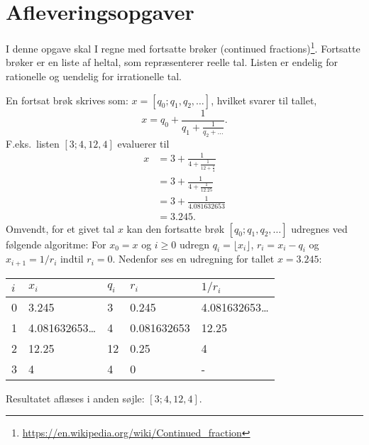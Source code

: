 \documentclass[a4paper,12pt]{article}
\begin{document}
\section*{Afleveringsopgaver}
I denne opgave skal I regne med fortsatte brøker (continued fractions)\footnote{\url{https://en.wikipedia.org/wiki/Continued_fraction}}. Fortsatte brøker er en liste af heltal, som repræsenterer reelle tal. Listen er endelig for rationelle og uendelig for irrationelle tal. 

En fortsat brøk skrives som:
$x = [q_0; q_1, q_2, \ldots]$, hvilket svarer til tallet,
\begin{equation}
  x = q_0 + \frac{1}{q_1 + \frac{1}{q_2 + \dots}}.
\end{equation}
F.eks.\ listen $[3;4, 12, 4]$ evaluerer til
\begin{align}
  x &= 3 + \frac{1}{4 + \frac{1}{12 + \frac{1}{4}}}
  \\&=  3 + \frac{1}{4 + \frac{1}{12.25}}
  \\&=  3 + \frac{1}{4.081632653}
  \\&=  3.245.
\end{align}
Omvendt, for et givet tal $x$ kan den fortsatte brøk $[q_0; q_1, q_2, \ldots]$ udregnes ved følgende algoritme: For $x_0 = x$ og $i \geq 0$ udregn $q_i = \lfloor x_i \rfloor$, $r_i = x_i - q_i$ og $x_{i+1} = 1/r_i$ indtil $r_i = 0$. Nedenfor ses en udregning for tallet $x=3.245$:
\begin{center}
  \begin{tabular}{|l|l|l|l|l|}
    \hline
    $i$ & $x_i$ & $q_i$ & $r_i$ & $1/r_i$\\
    \hline
    0 & 3.245 & 3 & 0.245 & 4.081632653\ldots\\
    1 & 4.081632653\ldots & 4 & 0.081632653 & 12.25\\
    2 & 12.25 & 12 & 0.25 & 4\\
    3 & 4 & 4 & 0 & -\\
    \hline
  \end{tabular}
\end{center}
Resultatet aflæses i anden søjle: $[3; 4, 12, 4]$.
\end{document}
